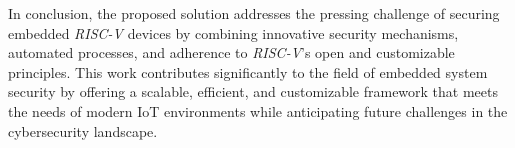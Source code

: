 In conclusion, the proposed solution addresses the pressing challenge of securing
embedded \textit{RISC-V} devices by combining innovative security mechanisms, automated
processes, and adherence to \textit{RISC-V}'s open and customizable principles.
This work contributes significantly to the field of embedded system security by
offering a scalable, efficient, and customizable framework that meets the needs
of modern IoT environments while anticipating future challenges in the
cybersecurity landscape.
